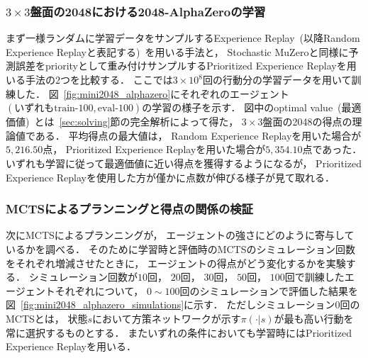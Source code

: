 \subsubsection{$3\times3$盤面の2048における2048-AlphaZeroの学習}
まず一様ランダムに学習データをサンプルするExperience Replay~(以降Random Experience Replayと表記する)~を用いる手法と， Stochastic MuZeroと同様に予測誤差をpriorityとして重み付けサンプルするPrioritized Experience Replayを用いる手法の$2$つを比較する．
ここでは$3\times{10}^8$回の行動分の学習データを用いて訓練した．
図~\ref{fig:mini2048_alphazero}にそれぞれのエージェント$(\text{いずれもtrain-}100,\text{eval-}100)$の学習の様子を示す．
図中のoptimal value~(最適価値)~とは~\ref{sec:solving}節の完全解析によって得た， $3\times3$盤面の2048の得点の理論値である．
平均得点の最大値は， Random Experience Replayを用いた場合が$5,216.50$点， Prioritized Experience Replayを用いた場合が$5,354.10$点であった．
いずれも学習に従って最適価値に近い得点を獲得するようになるが， Prioritized Experience Replayを使用した方が僅かに点数が伸びる様子が見て取れる．

\subsubsection{MCTSによるプランニングと得点の関係の検証}
次にMCTSによるプランニングが， エージェントの強さにどのように寄与しているかを調べる．
そのために学習時と評価時のMCTSのシミュレーション回数をそれぞれ増減させたときに， エージェントの得点がどう変化するかを実験する．
シミュレーション回数が$10$回， $20$回， $30$回， $50$回， $100$回で訓練したエージェントそれぞれについて， $0 \sim 100$回のシミュレーションで評価した結果を図~\ref{fig:mini2048_alphazero_simulations}に示す．
ただしシミュレーション$0$回のMCTSとは， 状態$s$において方策ネットワークが示す$\pi(\cdot|s)$が最も高い行動を常に選択するものとする．
またいずれの条件においても学習時にはPrioritized Experience Replayを用いる．

